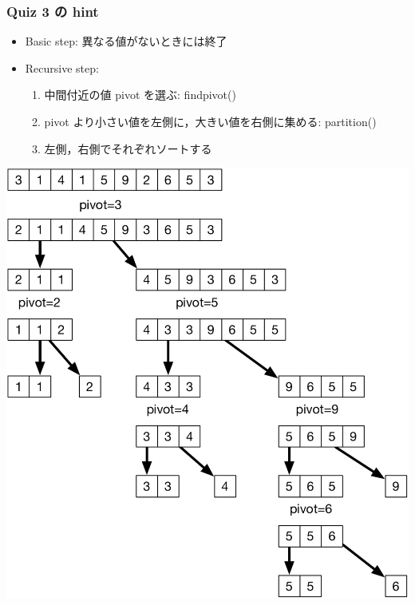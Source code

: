 \begin{frame}[shrink]
\frametitle{Quiz 3 の hint}
  \begin{itemize}
\scriptsize
\item Basic step: 異なる値がないときには終了
\item Recursive step:
    \begin{enumerate}
\scriptsize
\item 中間付近の値 pivot を選ぶ: findpivot()
\item pivot より小さい値を左側に，大きい値を右側に集める: partition()
\item 左側，右側でそれぞれソートする
    \end{enumerate}
  \end{itemize}
  \begin{center}
\includegraphics[scale=0.3]{./Figure/quick_sort.pdf}
  \end{center}
\end{frame}

